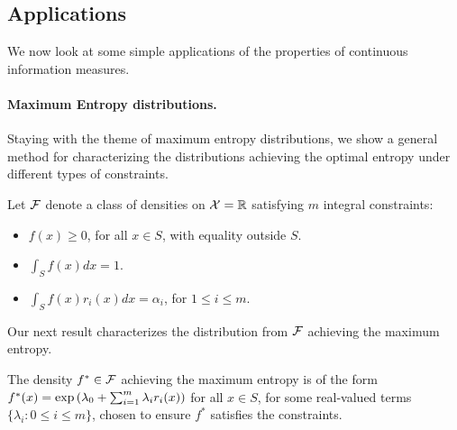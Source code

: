         \subsection{Applications}
        \label{subsec:applications-continuous}
            We now look at some simple applications of the properties of continuous information measures. 

       \paragraph{Maximum Entropy distributions.} Staying with the theme of maximum entropy distributions, we show a general method for characterizing the distributions achieving the optimal entropy under different types of constraints. 
        
        Let $\mathcal{F}$ denote a class of densities on $\mathcal{X} = \mathbb{R}$ satisfying $m$ integral constraints: 
        \begin{itemize}
            \item $f(x) \geq 0$, for all $x \in S$, with equality outside $S$. 
            \item $\int_S f(x) dx = 1$. 
            \item $\int_S f(x) r_i(x)dx = \alpha_i$, for $1 \leq i \leq m$. 
        \end{itemize}
        Our next result characterizes the distribution from $\mathcal{F}$ achieving the maximum entropy. 
        \begin{proposition}
            \label{prop:max-entropy} The density $f^* \in \mathcal{F}$ achieving the maximum entropy is of the form $f^*(x) = \exp \left( \lambda_0 + \sum_{i=1}^m \lambda_i r_i(x) \right)$ for all $x \in S$, for some real-valued terms $\{\lambda_i: 0 \leq i \leq m\}$, chosen to ensure $f^*$ satisfies the constraints.  
        \end{proposition}

